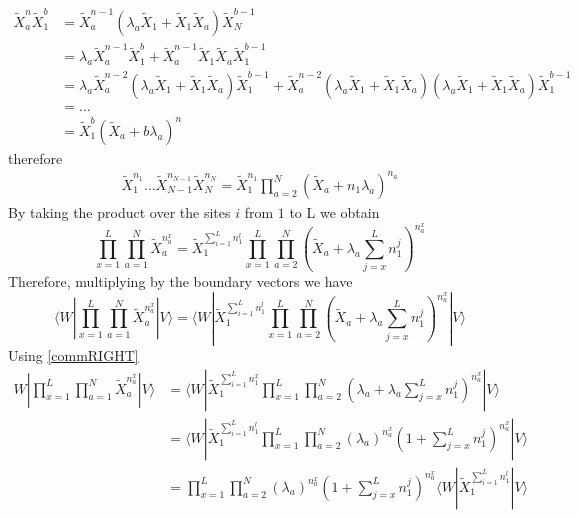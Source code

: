 \documentclass[11pt]{article}
\numberwithin{equation}{section}
\numberwithin{equation}{subsection}
\begin{document}
\begin{align*}
	\widetilde{X}_{a}^{n}\widetilde{X}_{1}^{b}&=\widetilde{X}_{a}^{n-1}\left(\lambda_{a}\widetilde{X}_{1}+\widetilde{X}_{1}\widetilde{X}_{a}\right)\widetilde{X}_{N}^{b-1}
	\\&=\lambda_{a}\widetilde{X}_{a}^{n-1}\widetilde{X}_{1}^{b}+\widetilde{X}_{a}^{n-1}\widetilde{X}_{1}\widetilde{X}_{a}\widetilde{X}_{1}^{b-1}
	\\&=
	\lambda_{a}\widetilde{X}_{a}^{n-2}\left(\lambda_{a}\widetilde{X}_{1}+\widetilde{X}_{1}\widetilde{X}_{a}\right)\widetilde{X}_{1}^{b-1}+\widetilde{X}_{a}^{n-2}\left(\lambda_{a}\widetilde{X}_{1}+\widetilde{X}_{1}\widetilde{X}_{a}\right)\left(\lambda_{a}\widetilde{X}_{1}+\widetilde{X}_{1}\widetilde{X}_{a}\right)\widetilde{X}_{1}^{b-1}
	\\&=\ldots\\&=
	\widetilde{X}_{1}^{b}\left(\widetilde{X}_{a}+b\lambda_{a}\right)^{n}
\end{align*}
therefore 
\begin{align*}
	\widetilde{X}_{1}^{n_{1}}\ldots\widetilde{X}_{N-1}^{n_{N-1}}\widetilde{X}_{N}^{n_{N}}=\widetilde{X}_{1}^{n_{1}}\prod_{a=2}^{N}\left(\widetilde{X}_{a}+n_{1}\lambda_{a}\right)^{n_{a}}
\end{align*}
By taking the product over the sites $i$ from $1$ to L we obtain 
\begin{equation}
	\prod_{x=1}^{L}\prod_{a=1}^{N}\widetilde{X}_{a}^{n_{a}^{x}}=\widetilde{X}_{1}^{\sum_{i=1}^{L}n_{1}^{l}}\prod_{x=1}^{L}\prod_{a=2}^{N}\left(\widetilde{X}_{a}+\lambda_{a}\sum_{j=x}^{L}n_{1}^{j}\right)^{n_{a}^{x}}
\end{equation}
Therefore, multiplying by the boundary vectors we have 
\begin{equation}
	\langle W|\prod_{x=1}^{L}\prod_{a=1}^{N}\widetilde{X}_{a}^{n_{a}^{x}}
	|V \rangle=\langle W|\widetilde{X}_{1}^{\sum_{i=1}^{L}n_{1}^{l}}\prod_{x=1}^{L}\prod_{a=2}^{N}\left(\widetilde{X}_{a}+\lambda_{a}\sum_{j=x}^{L}n_{1}^{j}\right)^{n_{a}^{x}}|V\rangle
\end{equation}
Using \eqref{commRIGHT}
\begin{align*}
	W|\prod_{x=1}^{L}\prod_{a=1}^{N}\widetilde{X}_{a}^{n_{a}^{x}}
	|V \rangle&=\langle W|\widetilde{X}_{1}^{\sum_{i=1}^{L}n_{1}^{x}}\prod_{x=1}^{L}\prod_{a=2}^{N}\left(\lambda_{a}+\lambda_{a}\sum_{j=x}^{L}n_{1}^{j}\right)^{n_{a}^{x}}|V\rangle
	\\&=
	\langle W|\widetilde{X}_{1}^{\sum_{i=1}^{L}n_{1}^{l}}\prod_{x=1}^{L}\prod_{a=2}^{N}\left(\lambda_{a}\right)^{n_{a}^{x}}\left(1+\sum_{j=x}^{L}n_{1}^{j}\right)^{n_{a}^{x}}|V\rangle
	\\&=
	\prod_{x=1}^{L}\prod_{a=2}^{N}\left(\lambda_{a}\right)^{n_{a}^{x}}\left(1+\sum_{j=x}^{L}n_{1}^{j}\right)^{n_{a}^{x}}\langle W|\widetilde{X}_{1}^{\sum_{i=1}^{L}n_{1}^{l}}|V\rangle
\end{align*}
\end{document}
